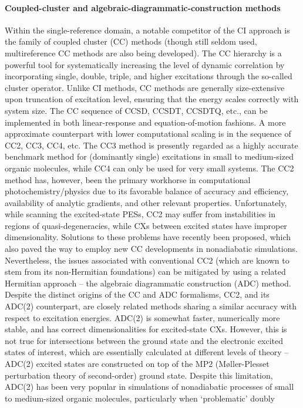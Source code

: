 \documentclass[9pt,bestpractices,pubversion]{livecoms}
\begin{document}
\paragraph{Coupled-cluster and algebraic-diagrammatic-construction methods}
Within the single-reference domain, a notable competitor of the CI approach is the family of coupled cluster (CC) methods (though still seldom used, multireference CC methods are also being developed\cite{evangelista2018perspective}). The CC hierarchy is a powerful tool for systematically increasing the level of dynamic correlation by incorporating single, double, triple, and higher excitations through the so-called cluster operator. Unlike CI methods, CC methods are generally size-extensive upon truncation of excitation level, ensuring that the energy scales correctly with system size. The CC sequence of CCSD, CCSDT, CCSDTQ, etc., can be implemented in both linear-response and equation-of-motion fashions.\cite{watts2008introduction,krylov_equation--motion_2008} A more approximate counterpart with lower computational scaling is in the sequence of CC2, CC3, CC4, etc.\cite{sneskov2012excited} The CC3 method is presently regarded as a highly accurate benchmark method for (dominantly single) excitations in small to medium-sized organic molecules,\cite{loos2020adc} while CC4 can only be used for very small systems.\cite{loos2022mountaineering} The CC2 method has, however, been the primary workhorse in computational photochemistry/physics due to its favorable balance of accuracy and efficiency, availability of analytic gradients,\cite{kohn2003analytic} and other relevant properties. Unfortunately, while scanning the excited-state PESs, CC2 may suffer from instabilities in regions of quasi-degeneracies,\cite{plasser2014surface,parker2016unphysical} while CXs between excited states have improper dimensionality\cite{tuna2015assessment}. Solutions to these problems have recently been proposed,\cite{kjonstad2017crossing,kjonstad2017resolving} which also paved the way to employ new CC developments in nonadiabatic simulations.\cite{kjonstad2024photoinduced,hait2024prediction} Nevertheless, the issues associated with conventional CC2 (which are known to stem from its non-Hermitian foundations) can be mitigated by using a related Hermitian approach -- the algebraic diagrammatic construction (ADC) method. Despite the distinct origins of the CC and ADC formalisms, CC2, and its ADC(2) counterpart, are closely related methods\cite{hattig2005structure} sharing a similar accuracy with respect to excitation energies. ADC(2) is somewhat faster, numerically more stable,\cite{plasser2014surface} and has correct dimensionalities for excited-state CXs.\cite{tuna2015assessment,taylor2023description} However, this is not true for intersections between the ground state and the electronic excited states of interest\cite{tuna2015assessment,taylor2023description}, which are essentially calculated at different levels of theory  -- ADC(2) excited states are constructed on top of the MP2 (M\o ller-Plesset perturbation theory of second-order) ground state. Despite this limitation, ADC(2) has been very popular in simulations of nonadiabatic processes of small to medium-sized organic molecules, particularly when `problematic' doubly 
\end{document}
